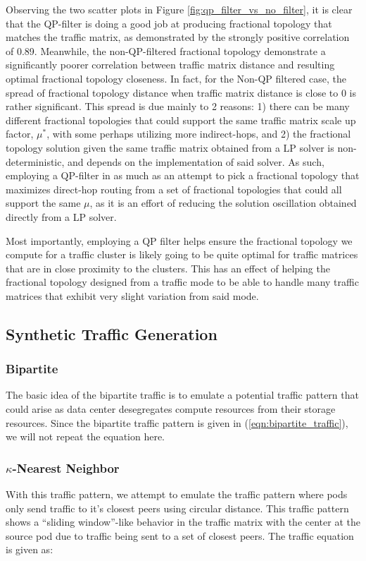 \documentclass[sigconf]{acmart}
\theoremstyle{definition}
\begin{document}
\begin{appendices}
Observing the two scatter plots in Figure \ref{fig:qp_filter_vs_no_filter}, it is clear that the QP-filter is doing a good job at producing fractional topology that matches the traffic matrix, as demonstrated by the strongly positive correlation of 0.89. Meanwhile, the non-QP-filtered fractional topology demonstrate a significantly poorer correlation between traffic matrix distance and resulting optimal fractional topology closeness. In fact, for the Non-QP filtered case, the spread of fractional topology distance when traffic matrix distance is close to 0 is rather significant. This spread is due mainly to 2 reasons: 1) there can be many different fractional topologies that could support the same traffic matrix scale up factor, $\mu^*$, with some perhaps utilizing more indirect-hops, and 2) the fractional topology solution given the same traffic matrix obtained from a LP solver is non-deterministic, and depends on the implementation of said solver. As such, employing a QP-filter in as much as an attempt to pick a fractional topology that maximizes direct-hop routing from a set of fractional topologies that could all support the same $\mu$, as it is an effort of reducing the solution oscillation obtained directly from a LP solver.

Most importantly, employing a QP filter helps ensure the fractional topology we compute for a traffic cluster is likely going to be quite optimal for traffic matrices that are in close proximity to the clusters. This has an effect of helping the fractional topology designed from a traffic mode to be able to handle many traffic matrices that exhibit very slight variation from said mode.


\subsection{Synthetic Traffic Generation}
\subsubsection{Bipartite\\}
The basic idea of the bipartite traffic is to emulate a potential traffic pattern that could arise as data center desegregates compute resources from their storage resources. Since the bipartite traffic pattern is given in (\ref{eqn:bipartite_traffic}), we will not repeat the equation here.

\subsubsection{$\kappa$-Nearest Neighbor\\}
With this traffic pattern, we attempt to emulate the traffic pattern where pods only send traffic to it's closest peers using circular distance. This traffic pattern shows a ``sliding window''-like behavior in the traffic matrix with the center at the source pod due to traffic being sent to a set of closest peers. The traffic equation is given as:


\end{appendices}
\end{document}
